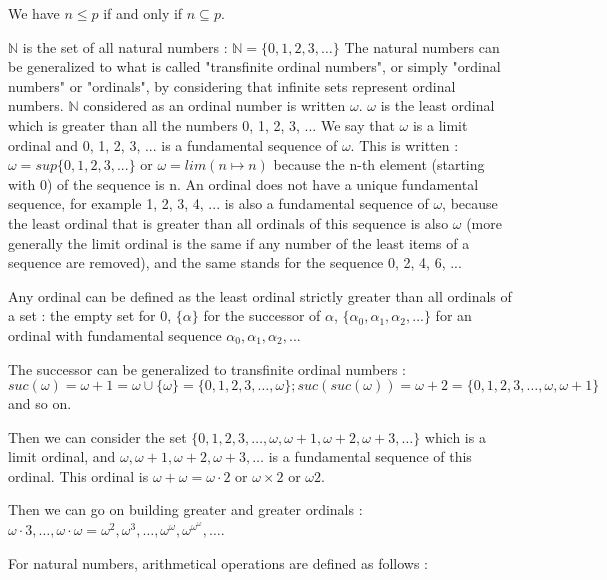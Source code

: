 \documentclass[10pt]{article}
\begin{document}
We have \( n \leq p \) if and only if \( n \subseteq p \).

\( \mathbb{N} \) is the set of all natural numbers : \( \mathbb{N} = \lbrace0,1,2,3,\ldots\rbrace \)
The natural numbers can be generalized to what is called "transfinite ordinal numbers", or simply "ordinal numbers" or "ordinals", by considering that infinite sets represent ordinal numbers. \( \mathbb{N} \) considered as an ordinal number is written \( \omega \).
\( \omega \) is the least ordinal which is greater than all the numbers 0, 1, 2, 3, ... We say that \( \omega \) is a limit ordinal and 0, 1, 2, 3, ... is a fundamental sequence of \( \omega \). This is written : \( \omega = sup \lbrace 0, 1, 2, 3, ... \rbrace \) or \( \omega = lim ( n \mapsto n )  \) because the n-th element (starting with 0) of the sequence is n. An ordinal does not have a unique fundamental sequence, for example 1, 2, 3, 4, ... is also a fundamental sequence of \( \omega \), because the least ordinal that is greater than all ordinals of this sequence is also \( \omega \) (more generally the limit ordinal is the same if any number of the least items of a sequence are removed), and the same stands for the sequence 0, 2, 4, 6, ...

Any ordinal can be defined as the least ordinal strictly greater than all ordinals of a set : the empty set for 0, \(\lbrace \alpha \rbrace\) for the successor of \( \alpha \),  \(\lbrace \alpha_0,\alpha_1,\alpha_2,...\rbrace\) for an ordinal with fundamental sequence \(\alpha_0, \alpha_1, \alpha_2, ...\)

The successor can be generalized to transfinite ordinal numbers : \( suc(\omega) = \omega+1 =\omega \cup \lbrace \omega \rbrace = \lbrace 0, 1, 2, 3, \ldots, \omega \rbrace ; suc(suc(\omega)) = \omega+2 = \lbrace 0, 1, 2, 3, \ldots, \omega, \omega+1 \rbrace \) and so on.

Then we can consider the set \( \lbrace 0, 1, 2, 3, \ldots, \omega, \omega+1, \omega+2, \omega+3, \ldots \rbrace \) which is a limit ordinal, and \( \omega, \omega+1, \omega+2, \omega+3, \ldots \) is a fundamental sequence of this ordinal. This ordinal is \( \omega+\omega = \omega \cdot 2 \) or \( \omega \times 2 \) or \( \omega 2 \).

Then we can go on building greater and greater ordinals : \( \omega \cdot 3, \ldots, \omega \cdot \omega = \omega^2, \omega^3, \ldots, \omega^\omega, \omega^{\omega^\omega}, \ldots \).

\bigskip

For natural numbers, arithmetical operations are defined as follows :
\end{document}
